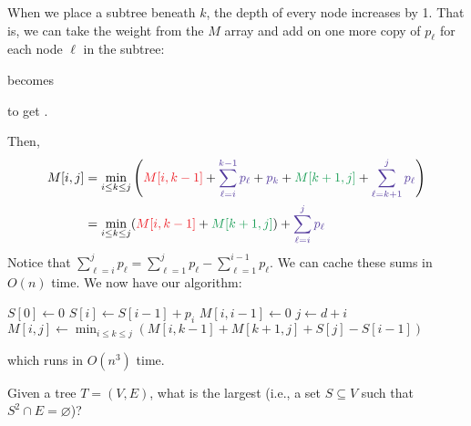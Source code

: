 When we place a subtree beneath $k$, the depth of every node increases by 1.
That is, we can take the weight from the $M$ array and add on one more copy of $p_\ell$
for each node $\ell$ in the subtree:
\begin{center}
  becomes
  to get .
\end{center}
Then,
\begin{align*}
  M[i,j]
   & = \min_{i \leq k \leq j}\qty({\color{Red}M[i,k-1]} + {\color{Violet}\sum_{\ell=i}^{k-1}p_\ell} + {\color{Violet}p_k} + {\color{ForestGreen}M[k+1,j]} + {\color{Violet}\sum_{\ell=k+1}^j p_\ell}) \\
   & = \min_{i \leq k \leq j}({\color{Red}M[i,k-1]} + {\color{ForestGreen}M[k+1,j]}) + \color{Violet}\sum_{\ell=i}^j p_\ell
\end{align*}
Notice that $\sum_{\ell=i}^j p_\ell = \sum_{\ell=1}^j p_\ell - \sum_{\ell=1}^{i-1} p_\ell$.
We can cache these sums in $O(n)$ time.
We now have our algorithm:

\begin{algorithm}[H]
  \caption{}
  \begin{algorithmic}[1]
    \State $S[0] \gets 0$
      \State $S[i] \gets S[i-1] + p_i$
    \EndFor
      \State $M[i,i-1] \gets 0$
    \EndFor
     
        \State $j \gets d + i$
        \State $M[i,j] \gets \min_{i \leq k \leq j}(M[i,k-1]+M[k+1,j] + S[j] - S[i-1])$
      \EndFor
    \EndFor
  \end{algorithmic}
\end{algorithm}
which runs in $O(n^3)$ time.

\begin{problem}
  Given a tree $T = (V,E)$, what is the largest 
  (i.e., a set $S \subseteq V$ such that $S^2 \cap E = \varnothing$)?
\end{problem}

